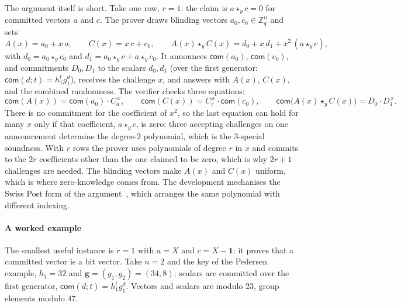 \documentclass[11pt,a4paper]{article}
\newcommand{\Z}{\mathbb{Z}}
\newcommand{\com}{\mathsf{com}}
\theoremstyle{remark}
\begin{document}
The argument itself is short. Take one row, $r = 1$: the claim is $a
\star_y c = 0$ for committed vectors $a$ and $c$. The prover draws
blinding vectors $a_0, c_0 \in \Z_q^n$ and sets
\[
  A(x) = a_0 + x\,a, \qquad C(x) = x\,c + c_0, \qquad
  A(x) \star_y C(x) = d_0 + x\,d_1 + x^2\,(a \star_y c),
\]
with $d_0 = a_0 \star_y c_0$ and $d_1 = a_0 \star_y c + a \star_y c_0$. It
announces $\com(a_0)$, $\com(c_0)$, and commitments $D_0, D_1$ to the
scalars $d_0, d_1$ (over the first generator: $\com(d; t) = h_1^t
g_1^d$), receives the challenge $x$, and answers with $A(x)$, $C(x)$, and
the combined randomness. The verifier checks three equations:
\[
  \com(A(x)) = \com(a_0) \cdot C_a^{\,x}, \qquad
  \com(C(x)) = C_c^{\,x} \cdot \com(c_0), \qquad
  \com\big(A(x) \star_y C(x)\big) = D_0 \cdot D_1^{\,x}.
\]
There is no commitment for the coefficient of $x^2$, so the last equation
can hold for many $x$ only if that coefficient, $a \star_y c$, is zero:
three accepting challenges on one announcement determine the
degree-$2$ polynomial, which is the $3$-special soundness. With $r$ rows
the prover uses polynomials of degree $r$ in $x$ and commits to the $2r$
coefficients other than the one claimed to be zero, which is why $2r + 1$
challenges are needed. The blinding vectors make $A(x)$ and $C(x)$
uniform, which is where zero-knowledge comes from. The development
mechanises the Swiss Post form of the argument~\cite{swisspost}, which
arranges the same polynomial with different indexing.

\paragraph{A worked example} The smallest useful instance is $r = 1$
with $a = X$ and $c = X - \mathbf{1}$: it proves that a committed vector
is a bit vector. Take $n = 2$ and the key of the Pedersen example,
$h_1 = 32$ and $\mathbf{g} = (g_1, g_2) = (34, 8)$; scalars are committed
over the first generator, $\com(d; t) = h_1^{t} g_1^{d}$. Vectors and
scalars are modulo $23$, group elements modulo $47$.
\end{document}
